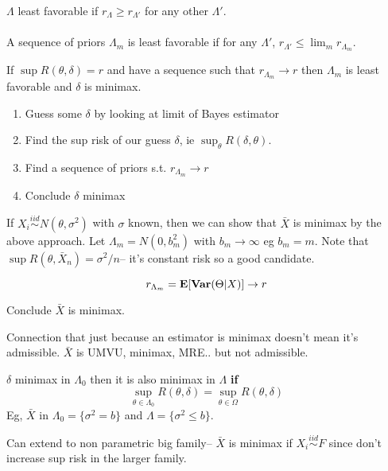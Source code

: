 \documentclass{article}
\newcommand{\simiid}{\overset{iid}\sim }
\begin{document}
\begin{definition}
$\Lambda$ least favorable if $r_\Lambda \geq r_{\Lambda'}$ for any other $\Lambda'$. \\\\
A sequence of priors $\Lambda_m$ is least favorable if for any $\Lambda'$, $r_{\Lambda'} \leq \lim_m r_{\Lambda_m}$.
\end{definition}

\begin{recipe}
If $\sup R(\theta,\delta) = r$ and have a sequence such that $r_{\Lambda_m} \to r$ then $\Lambda_m$ is least favorable and $\delta$ is minimax. 
\begin{enumerate}
	\item Guess some $\delta$ by looking at limit of Bayes estimator
	\item Find the sup risk of our guess $\delta$, ie $\sup_\theta R(\delta, \theta)$.
	\item Find a sequence of priors s.t. $r_{\Lambda_m} \to r$ 
	\item Conclude $\delta$ minimax
\end{enumerate}
\end{recipe}
\begin{example}
If $X_i \simiid N(\theta,\sigma^2)$ with $\sigma$ known, then we can show that $\bar X$ is minimax by the above approach. Let $\Lambda_m = N(0,b_m^2)$ with $b_m \to \infty$ eg $b_m = m$. Note that $\sup R(\theta, \bar X_n) = \sigma^2/n$-- it's constant risk so a good candidate. 

$$r_{\Lambda_m} = \mathbf{E} [\mathbf{Var} (\Theta|X)] \to r$$

Conclude $\bar X$ is minimax.
\end{example}

Connection that just because an estimator is minimax doesn't mean it's admissible. $\bar X$ is UMVU, minimax, MRE.. but not admissible. 
\begin{recipe}
$\delta$ minimax in $\Lambda_0$ then it is also minimax in $\Lambda$ \textbf{if} 
$$\sup_{\theta\in \Lambda_0} R(\theta,\delta) = \sup_{\theta \in \Omega} R(\theta,\delta)$$
Eg, $\bar X$ in $\Lambda_0 = \{\sigma^2 = b\}$ and $\Lambda = \{\sigma^2 \leq b\}$. 
\end{recipe}
Can extend to non parametric big family-- $\bar X$ is minimax if $X_i \simiid F$ since don't increase sup risk in the larger family. 
\end{document}
